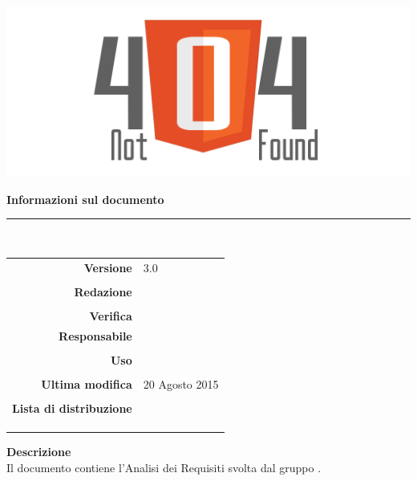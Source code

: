 \thispagestyle{empty}

\begin{titlepage}
	
	\begin{center}
	\begin{Huge}
		\textbf{\gruppo} \\
	\end{Huge}
	\vspace{0.5cm}
	\begin{Large}
		\textbf{\capitolato}
	\end{Large}
	
	\vspace{1cm}
    
	\includegraphics[scale=0.35]{../logo/logo404_Extends.png}
	\vspace{1cm}
	\begin{Huge}
		\textbf{\titDoc}
	\end{Huge}
	
	\vspace{1cm}
	\textbf{Informazioni sul documento}\\
    \rule{10cm}{.4pt} \\
	\begin{table}[h]
	\begin{center}
	\begin{tabular}{r | l}
		\textbf{Versione} & 3.0 \\ \\
		\textbf{Redazione} & \DeEn \\
			& \CoMa \\
		\textbf{Verifica} &\CaMa \\ 
		\textbf{Responsabile} & \CoMa \\ \\
		\textbf{Uso} & \uso \\ \\
		\textbf{Ultima modifica} & 20 Agosto 2015 \\ \\
		\textbf{Lista di distribuzione} & \gruppo \\ 
					& \Vardanega \\
					& \Cardin \\
					& \Zucchetti \\
	\end{tabular}
	\end{center}
	\end{table}
			\textbf{Descrizione} \\
Il documento contiene l'Analisi dei Requisiti svolta dal gruppo \gruppo.
	\end{center}
\end{titlepage}